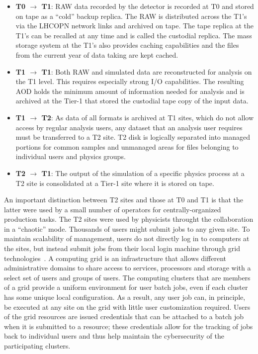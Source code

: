 \begin{itemize}
\item {\bf T0 $\to$ T1}: RAW data recorded by the detector is recorded at
  T0 and stored on tape as a ``cold'' backup replica. The RAW is
  distributed across the T1's via the LHCOPN network links and archived on
  tape. The tape replica at the T1's can be recalled at any time and is
  called the custodial replica. The mass storage system at the T1's also
  provides caching capabilities and the files from the current year of data
  taking are kept cached.

\item {\bf T1 $\to$ T1}: Both RAW and simulated data are reconstructed for
  analysis on the T1 level. This requires especially strong I/O
  capabilities. The resulting AOD holds the minimum amount of information
  needed for analysis and is archived at the Tier-1 that stored the
  custodial tape copy of the input data.

\item {\bf T1 $\to$ T2}: As data of all formats is archived at T1 sites,
  which do not allow access by regular analysis users, any dataset that an
  analysis user requires must be transferred to a T2 site.  T2 disk is
  logically separated into managed portions for common samples and
  unmanaged areas for files belonging to individual users and physics
  groups.

\item {\bf T2 $\to$ T1}: The output of the simulation of a specific physics
  process at a T2 site is consolidated at a Tier-1 site where it is stored
  on tape.
\end{itemize}

An important distinction between T2 sites and those at T0 and T1 is that
the latter were used by a small number of operators for centrally-organized
production tasks.  The T2 sites were used by physicists throught the
collaboration in a ``chaotic'' mode.  Thousands of users might submit jobs
to any given site.  To maintain scalability of management, users do not
directly log in to computers at the sites, but instead submit jobs from
their local login machine through grid technologies~\cite{thegrid}.  A
computing grid is an infrastructure that allows different administrative
domains to share access to services, processors and storage with a select
set of users and groups of users. The computing clusters that are members
of a grid provide a uniform environment for user batch jobs, even if each
cluster has some unique local configuration.  As a result, any user job
can, in principle, be executed at any site on the grid with little user
customization required.  Users of the grid resources are issued credentials
that can be attached to a batch job when it is submitted to a resource;
these credentials allow for the tracking of jobs back to individual users
and thus help maintain the cybersecurity of the participating clusters.

